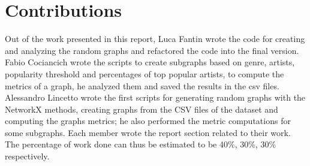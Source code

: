 \section*{Contributions}

Out of the work presented in this report, Luca Fantin wrote the code for creating and analyzing the random graphs and refactored the code into the final version.
Fabio Cociancich wrote the scripts to create subgraphs based on genre, artists, popularity threshold and percentages of top popular artists, to compute the metrics of a graph, he analyzed them and saved the results in the csv files.
Alessandro Lincetto wrote the first scripts for generating random graphs with the NetworkX methods, creating graphs from the CSV files of the dataset and computing the graphs metrics; he also performed the metric computations for some subgraphs.
Each member wrote the report section related to their work.
The percentage of work done can thus be estimated to be 40\%, 30\%, 30\% respectively.
